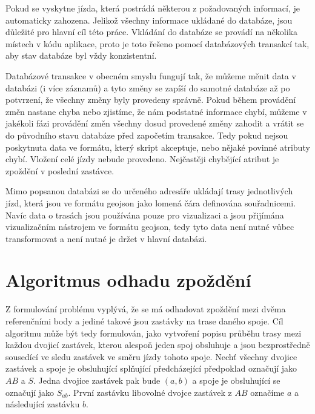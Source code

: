 \bigbreak


Pokud se vyskytne jízda, která postrádá některou z požadovaných informací, je automaticky zahozena. Jelikož všechny informace ukládané do databáze, jsou důležité pro hlavní cíl této práce. Vkládání do databáze se provádí na několika místech v kódu aplikace, proto je toto řešeno pomocí databázových transakcí tak, aby stav databáze byl vždy konzistentní.


\bigbreak


Databázové transakce v obecném smyslu fungují tak, že můžeme měnit data v databázi (i více záznamů) a tyto změny se zapíší do samotné databáze až po potvrzení, že všechny změny byly provedeny správně. Pokud během provádění změn nastane chyba nebo zjistíme, že nám podstatné informace chybí, můžeme v jakékoli fázi provádění změn všechny dosud provedené změny zahodit a vrátit se do původního stavu databáze před započetím transakce.  Tedy pokud nejsou poskytnuta data ve formátu, který skript akceptuje, nebo nějaké povinné atributy chybí. Vložení celé jízdy nebude provedeno. Nejčastěji chybějící atribut je zpoždění v poslední zastávce.


\bigbreak


Mimo popsanou databázi se do určeného adresáře ukládají trasy jednotlivých jízd, která jsou ve formátu \gls{geojson} jako lomená čára definována souřadnicemi. Navíc data o trasách jsou používána pouze pro vizualizaci a jsou přijímána vizualizačním nástrojem ve formátu \gls{geojson}, tedy tyto data není nutné vůbec transformovat a není nutné je držet v hlavní databázi.


\section{Algoritmus odhadu zpoždění}


Z formulování problému vyplývá, že se má odhadovat zpoždění mezi dvěma referenčními body a jediné takové jsou zastávky na trase daného spoje. Cíl algoritmu může být tedy formulován, jako vytvoření popisu průběhu trasy mezi každou dvojicí zastávek, kterou alespoň jeden spoj obsluhuje a jsou bezprostředně sousedící ve sledu zastávek ve směru jízdy tohoto spoje. Nechť všechny dvojice zastávek a spoje je obsluhující splňující předcházející předpoklad označují jako $AB$ a $S$. Jedna dvojice zastávek pak bude $(a, b)$ a spoje je obsluhující se označují jako $S_{ab}$. První zastávku libovolné dvojce zastávek z $AB$ označíme $a$ a následující zastávku $b$.


\bigbreak


